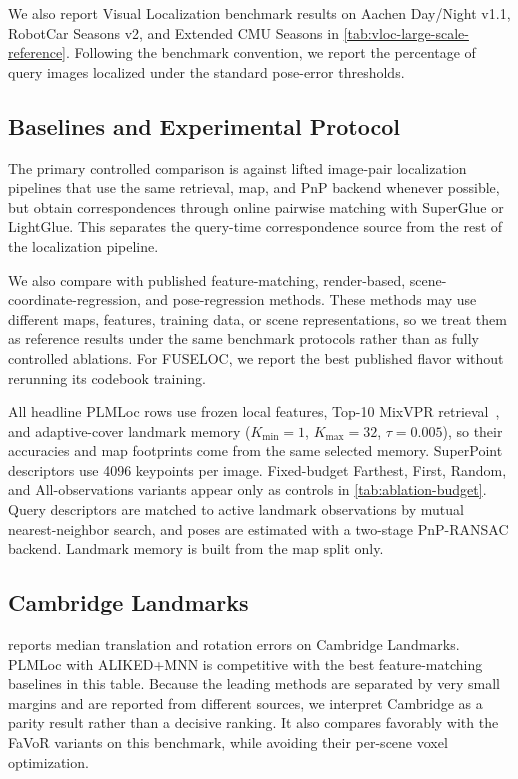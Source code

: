 \documentclass[letterpaper,10 pt,conference]{ieeeconf}
\newcommand{\method}{PLMLoc}
\begin{document}
We also report Visual Localization benchmark results on Aachen Day/Night v1.1, RobotCar Seasons v2, and Extended CMU Seasons in \cref{tab:vloc-large-scale-reference}. Following the benchmark convention, we report the percentage of query images localized under the standard pose-error thresholds.


\subsection{Baselines and Experimental Protocol}

The primary controlled comparison is against lifted image-pair localization pipelines that use the same retrieval, map, and PnP backend whenever possible, but obtain correspondences through online pairwise matching with SuperGlue or LightGlue. This separates the query-time correspondence source from the rest of the localization pipeline.

We also compare with published feature-matching, render-based, scene-coordinate-regression, and pose-regression methods. These methods may use different maps, features, training data, or scene representations, so we treat them as reference results under the same benchmark protocols rather than as fully controlled ablations. For FUSELOC, we report the best published flavor without rerunning its codebook training.

All headline \method{} rows use frozen local features, Top-10 MixVPR retrieval~\cite{alibey2023mixvpr,berton2025megaloc}, and adaptive-cover landmark memory ($K_{\min}=1$, $K_{\max}=32$, $\tau=0.005$), so their accuracies and map footprints come from the same selected memory. SuperPoint descriptors use 4096 keypoints per image. Fixed-budget Farthest, First, Random, and All-observations variants appear only as controls in \cref{tab:ablation-budget}. Query descriptors are matched to active landmark observations by mutual nearest-neighbor search, and poses are estimated with a two-stage PnP-RANSAC backend. Landmark memory is built from the map split only.

\subsection{Cambridge Landmarks}

 reports median translation and rotation errors on Cambridge Landmarks. \method{} with ALIKED+MNN is competitive with the best feature-matching baselines in this table. Because the leading methods are separated by very small margins and are reported from different sources, we interpret Cambridge as a parity result rather than a decisive ranking. It also compares favorably with the FaVoR variants on this benchmark, while avoiding their per-scene voxel optimization.
\end{document}
